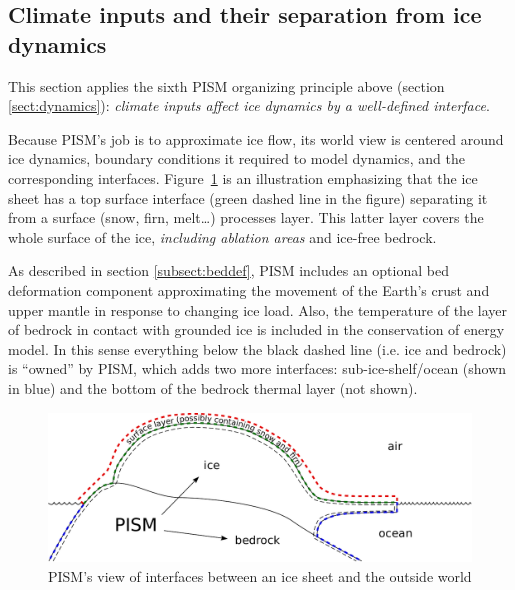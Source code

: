 \documentclass[11pt,final]{amsart}
\begin{document}
\subsection{Climate inputs and their separation from ice dynamics}
\label{sec:climate-inputs}  This section applies the sixth PISM organizing principle above (section \ref{sect:dynamics}): \emph{climate inputs affect ice dynamics by a well-defined interface}.

Because PISM's job is to approximate ice flow, its world view is centered around ice dynamics, boundary conditions it required to model dynamics, and the corresponding interfaces.  Figure~\ref{fig:climate-inputs} is an illustration emphasizing that the ice sheet has a top surface interface (green dashed line in the figure) separating it from a surface (snow, firn, melt\dots) processes layer.  This latter layer covers the whole surface of the ice, \emph{including ablation areas} and ice-free bedrock.

As described in section \ref{subsect:beddef}, PISM includes an optional bed
deformation component approximating the movement of the Earth's crust and upper
mantle in response to changing ice load. Also, the temperature of the layer of
bedrock in contact with grounded ice is included in the conservation of energy
model. In this sense everything below the black dashed line (i.e. ice and
bedrock) is ``owned'' by PISM, which adds two more interfaces:
sub-ice-shelf/ocean (shown in blue) and the bottom of the bedrock thermal layer
(not shown).

\begin{figure}
  \centering
  \includegraphics[width=5in]{figs/climate-cartoon-new.pdf}
  \caption{PISM's view of interfaces between an ice sheet and the outside world}
  \label{fig:climate-inputs}
\end{figure}
\end{document}
